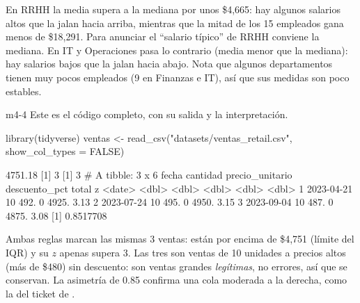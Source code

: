 En RRHH la media supera a la mediana por unos \$4,665: hay algunos
salarios altos que la jalan hacia arriba, mientras que la mitad de los 15
empleados gana menos de \$18,291. Para anunciar el ``salario típico'' de RRHH
conviene la mediana. En IT y Operaciones pasa lo contrario (media menor que
la mediana): hay salarios bajos que la jalan hacia abajo. Nota que algunos
departamentos tienen muy pocos empleados (9 en Finanzas e IT), así que sus
medidas son poco estables.


\begin{solucion}{m4-4}
Este es el código completo, con su salida y la interpretación.
\end{solucion}

\begin{rcode}
library(tidyverse)
ventas <- read_csv("datasets/ventas_retail.csv", show_col_types = FALSE)
\end{rcode}

\begin{rsalida}
[1] 4751.18
[1] 3
[1] 3
# A tibble: 3 x 6
  fecha      cantidad precio_unitario descuento_pct total     z
  <date>        <dbl>           <dbl>         <dbl> <dbl> <dbl>
1 2023-04-21       10            492.             0 4925.  3.13
2 2023-07-24       10            495.             0 4950.  3.15
3 2023-09-04       10            487.             0 4875.  3.08
[1] 0.8517708
\end{rsalida}

Ambas reglas marcan las mismas 3 ventas: están por encima de \$4,751 (límite
del IQR) y su $z$ apenas supera 3. Las tres son ventas de 10 unidades a precios altos (más de \$480)
sin descuento: son ventas grandes \emph{legítimas}, no
errores, así que se conservan. La asimetría de 0.85 confirma una cola
moderada a la derecha, como la del ticket de .


